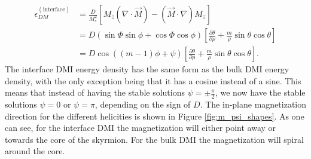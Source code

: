 \documentclass[1p]{elsarticle}		%
\numberwithin{equation}{section}
\begin{document}
\begin{align}
\nonumber \epsilon_{DM}^{(\text{interface})} &= \frac{D}{M_s^2}\left[ M_z (\nabla\cdot\vec{M}) - (\vec{M}\cdot\nabla)M_z\right] \\
\nonumber &= D\left(\sin\Phi\sin\phi+\cos\Phi\cos\phi\right)\left[\frac{\partial\theta}{\partial\rho}+\frac{m}{\rho}\sin\theta\cos\theta\right] \\
&= D\cos((m-1)\phi+\psi)\left[\frac{\partial\theta}{\partial\rho}+\frac{m}{\rho}\sin\theta\cos\theta\right].\label{eq:IntDMIepsilon}
\end{align}
The interface DMI energy density has the same form as the bulk DMI energy density, with the only exception being that it has a cosine instead of a sine. This means that instead of having the stable solutions $\psi = \pm \frac{\pi}{2}$, we now have the stable solutions $\psi=0$ or $\psi=\pi$, depending on the sign of $D$. The in-plane magnetization direction for the different helicities is shown in Figure \ref{fig:m_psi_shapes}. As one can see, for the interface DMI the magnetization will either point away or towards the core of the skyrmion. For the bulk DMI the magnetization will spiral around the core.\\
\end{document}
